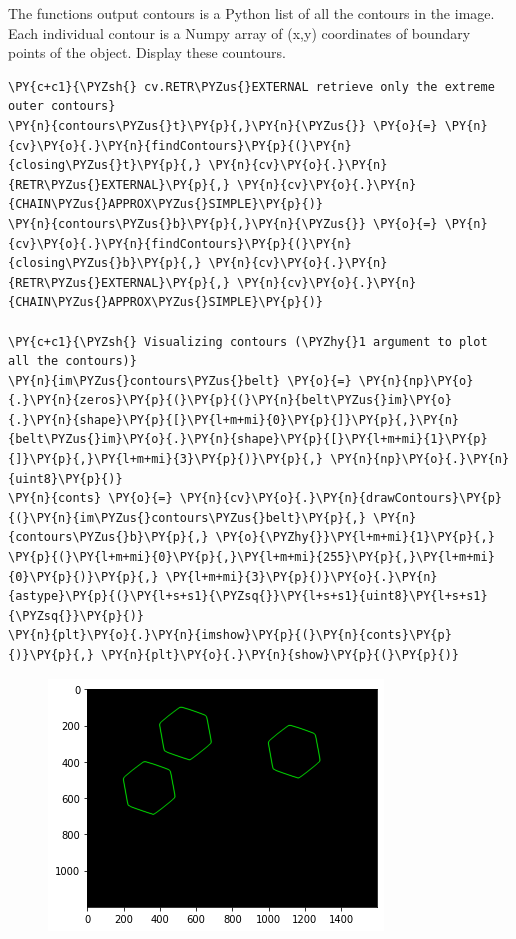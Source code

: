 \documentclass[a4paper,11pt]{article}%
\begin{document}
The functions output contours is a Python list of all the contours in the image. Each
individual contour is a Numpy array of (x,y) coordinates of boundary
points of the object. Display these countours.

    \begin{tcolorbox}[breakable, size=fbox, boxrule=1pt, pad at break*=1mm,colback=cellbackground, colframe=cellborder]
\begin{Verbatim}[commandchars=\\\{\}]
\PY{c+c1}{\PYZsh{} cv.RETR\PYZus{}EXTERNAL retrieve only the extreme outer contours}
\PY{n}{contours\PYZus{}t}\PY{p}{,}\PY{n}{\PYZus{}} \PY{o}{=} \PY{n}{cv}\PY{o}{.}\PY{n}{findContours}\PY{p}{(}\PY{n}{closing\PYZus{}t}\PY{p}{,} \PY{n}{cv}\PY{o}{.}\PY{n}{RETR\PYZus{}EXTERNAL}\PY{p}{,} \PY{n}{cv}\PY{o}{.}\PY{n}{CHAIN\PYZus{}APPROX\PYZus{}SIMPLE}\PY{p}{)}
\PY{n}{contours\PYZus{}b}\PY{p}{,}\PY{n}{\PYZus{}} \PY{o}{=} \PY{n}{cv}\PY{o}{.}\PY{n}{findContours}\PY{p}{(}\PY{n}{closing\PYZus{}b}\PY{p}{,} \PY{n}{cv}\PY{o}{.}\PY{n}{RETR\PYZus{}EXTERNAL}\PY{p}{,} \PY{n}{cv}\PY{o}{.}\PY{n}{CHAIN\PYZus{}APPROX\PYZus{}SIMPLE}\PY{p}{)}

\PY{c+c1}{\PYZsh{} Visualizing contours (\PYZhy{}1 argument to plot all the contours)}
\PY{n}{im\PYZus{}contours\PYZus{}belt} \PY{o}{=} \PY{n}{np}\PY{o}{.}\PY{n}{zeros}\PY{p}{(}\PY{p}{(}\PY{n}{belt\PYZus{}im}\PY{o}{.}\PY{n}{shape}\PY{p}{[}\PY{l+m+mi}{0}\PY{p}{]}\PY{p}{,}\PY{n}{belt\PYZus{}im}\PY{o}{.}\PY{n}{shape}\PY{p}{[}\PY{l+m+mi}{1}\PY{p}{]}\PY{p}{,}\PY{l+m+mi}{3}\PY{p}{)}\PY{p}{,} \PY{n}{np}\PY{o}{.}\PY{n}{uint8}\PY{p}{)}
\PY{n}{conts} \PY{o}{=} \PY{n}{cv}\PY{o}{.}\PY{n}{drawContours}\PY{p}{(}\PY{n}{im\PYZus{}contours\PYZus{}belt}\PY{p}{,} \PY{n}{contours\PYZus{}b}\PY{p}{,} \PY{o}{\PYZhy{}}\PY{l+m+mi}{1}\PY{p}{,} \PY{p}{(}\PY{l+m+mi}{0}\PY{p}{,}\PY{l+m+mi}{255}\PY{p}{,}\PY{l+m+mi}{0}\PY{p}{)}\PY{p}{,} \PY{l+m+mi}{3}\PY{p}{)}\PY{o}{.}\PY{n}{astype}\PY{p}{(}\PY{l+s+s1}{\PYZsq{}}\PY{l+s+s1}{uint8}\PY{l+s+s1}{\PYZsq{}}\PY{p}{)}
\PY{n}{plt}\PY{o}{.}\PY{n}{imshow}\PY{p}{(}\PY{n}{conts}\PY{p}{)}\PY{p}{,} \PY{n}{plt}\PY{o}{.}\PY{n}{show}\PY{p}{(}\PY{p}{)}
\end{Verbatim}
\end{tcolorbox}

    \begin{figure}[!h]
		\centering
    \includegraphics[scale=0.7]{figures/output_12_0.png}
    \end{figure}
    { \hspace*{\fill} \\}
\end{document}
